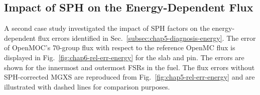 \subsection{Impact of SPH on the Energy-Dependent Flux}
\label{subsec:chap6-sph-flux-energy}

A second case study investigated the impact of \ac{SPH} factors on the energy-dependent flux errors identified in Sec.~\ref{subsec:chap5-diagnosis-energy}. The error of OpenMOC's 70-group flux with respect to the reference OpenMC flux is displayed in Fig.~\ref{fig:chap6-rel-err-energy} for the slab and pin. The errors are shown for the innermost and outermost \ac{FSR}s in the fuel. The flux errors without \ac{SPH}-corrected \ac{MGXS} are reproduced from Fig.~\ref{fig:chap5-rel-err-energy} and are illustrated with dashed lines for comparison purposes. 

